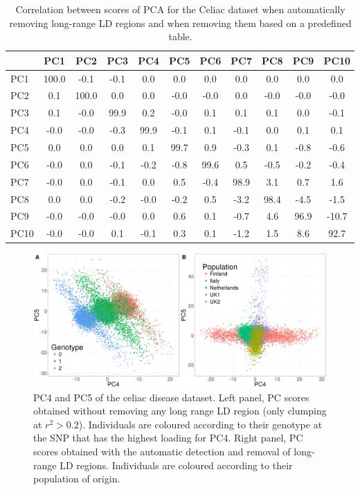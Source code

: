\documentclass[a4paper, 11pt]{article}
\begin{document}
\vspace{5em}

\begin{table}[!h]
\centering
\begin{tabular}{l|cccccccccc}
  \hline
 & PC1 & PC2 & PC3 & PC4 & PC5 & PC6 & PC7 & PC8 & PC9 & PC10 \\
  \hline
PC1 & 100.0 & -0.1 & -0.1 & 0.0 & 0.0 & 0.0 & 0.0 & 0.0 & 0.0 & 0.0 \\
  PC2 & 0.1 & 100.0 & 0.0 & 0.0 & -0.0 & -0.0 & 0.0 & -0.0 & -0.0 & -0.0 \\
  PC3 & 0.1 & -0.0 & 99.9 & 0.2 & -0.0 & 0.1 & 0.1 & 0.1 & 0.0 & -0.1 \\
  PC4 & -0.0 & -0.0 & -0.3 & 99.9 & -0.1 & 0.1 & -0.1 & 0.0 & 0.1 & 0.1 \\
  PC5 & 0.0 & 0.0 & 0.0 & 0.1 & 99.7 & 0.9 & -0.3 & 0.1 & -0.8 & -0.6 \\
  PC6 & -0.0 & 0.0 & -0.1 & -0.2 & -0.8 & 99.6 & 0.5 & -0.5 & -0.2 & -0.4 \\
  PC7 & -0.0 & 0.0 & -0.1 & 0.0 & 0.5 & -0.4 & 98.9 & 3.1 & 0.7 & 1.6 \\
  PC8 & 0.0 & 0.0 & -0.2 & -0.0 & -0.2 & 0.5 & -3.2 & 98.4 & -4.5 & -1.5 \\
  PC9 & -0.0 & -0.0 & -0.0 & 0.0 & 0.6 & 0.1 & -0.7 & 4.6 & 96.9 & -10.7 \\
  PC10 & -0.0 & -0.0 & 0.1 & -0.1 & 0.3 & 0.1 & -1.2 & 1.5 & 8.6 & 92.7 \\
   \hline
\end{tabular}
\caption{Correlation between scores of PCA for the Celiac dataset  when automatically removing long-range LD regions and when removing them based on a predefined table.}
\label{tab:pc-celiac}
\end{table}

\clearpage

\begin{figure}[!h]
\centerline{\includegraphics[width=\textwidth]{scores}}
\caption{PC4 and PC5 of the celiac disease dataset. Left panel, PC scores obtained without removing any long range LD region (only clumping at $r^2 > 0.2$). Individuals are coloured according to their genotype at the SNP that has the highest loading for PC4. Right panel, PC scores obtained with the automatic detection and removal of long-range LD regions. Individuals are coloured according to their population of origin.}\label{fig:scores}
\end{figure}
\end{document}
